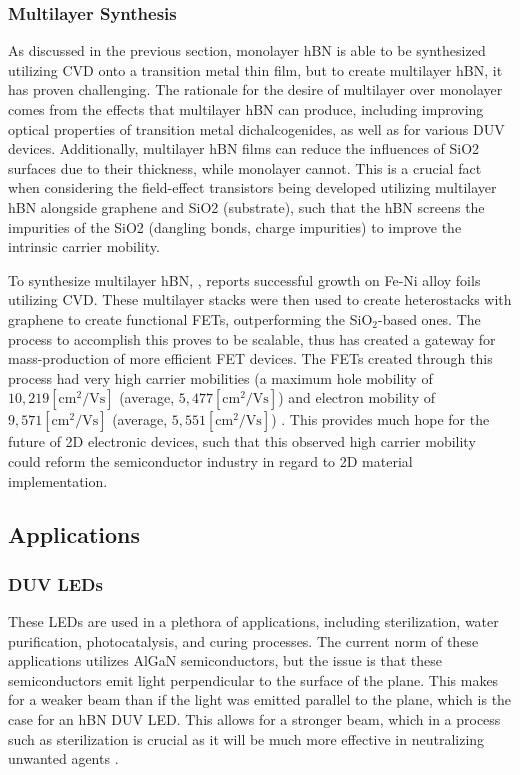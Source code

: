 \documentclass[conference]{IEEEtran}
\begin{document}
\subsubsection{Multilayer Synthesis}

As discussed in the previous section, monolayer hBN is able to be synthesized utilizing CVD onto a transition metal thin film, but to create multilayer hBN, it has proven challenging. The rationale for the desire of multilayer over monolayer comes from the effects that multilayer hBN can produce, including improving optical properties of transition metal dichalcogenides, as well as for various DUV devices. Additionally, multilayer hBN films can reduce the influences of SiO2 surfaces due to their thickness, while monolayer cannot. This is a crucial fact when considering the field-effect transistors being developed utilizing multilayer hBN alongside graphene and SiO2 (substrate), such that the hBN screens the impurities of the SiO2 (dangling bonds, charge impurities) to improve the intrinsic carrier mobility.

To synthesize multilayer hBN, \cite{jb3}, reports successful growth on Fe-Ni alloy foils utilizing CVD. These multilayer stacks were then used to create heterostacks with graphene to create functional FETs, outperforming the SiO$_2$-based ones. The process to accomplish this proves to be scalable, thus has created a gateway for mass-production of more efficient FET devices. The FETs created through this process had very high carrier mobilities (a maximum hole mobility of $10,219 [\si{\centi\meter\squared\per\volt\second}]$ (average, $5,477[\si{\centi\meter\squared\per\volt\second}]$) and electron mobility of $9,571[\si{\centi\meter\squared\per\volt\second}]$ (average, $5,551[\si{\centi\meter\squared\per\volt\second}]$) \cite{jb3}. This provides much hope for the future of 2D electronic devices, such that this observed high carrier mobility could reform the semiconductor industry in regard to 2D material implementation.

  \subsection{Applications}

  \subsubsection{DUV LEDs}

  These LEDs are used in a plethora of applications, including sterilization, water purification, photocatalysis, and curing processes. The current norm of these applications utilizes AlGaN semiconductors, but the issue is that these semiconductors emit light perpendicular to the surface of the plane. This makes for a weaker beam than if the light was emitted parallel to the plane, which is the case for an hBN DUV LED. This allows for a stronger beam, which in a process such as sterilization is crucial as it will be much more effective in neutralizing unwanted agents \cite{jb4}.
\end{document}
